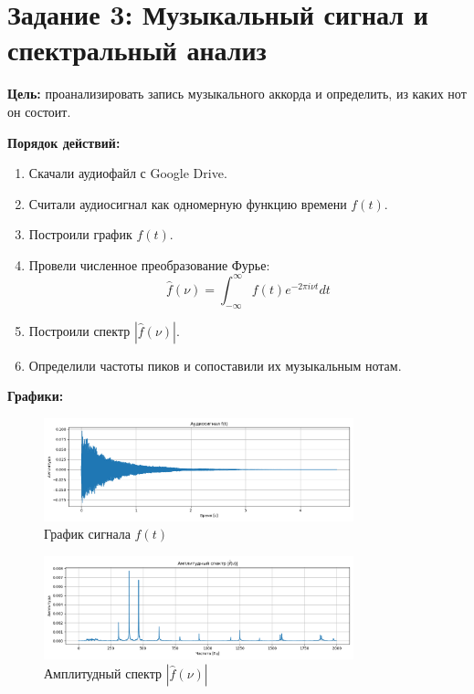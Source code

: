 \section*{Задание 3: Музыкальный сигнал и спектральный анализ}

\textbf{Цель:} проанализировать запись музыкального аккорда и определить, из каких нот он состоит.

\textbf{Порядок действий:}

\begin{enumerate}
    \item Скачали аудиофайл с Google Drive.
    \item Считали аудиосигнал как одномерную функцию времени $f(t)$.
    \item Построили график $f(t)$.
    \item Провели численное преобразование Фурье:
    \[
    \hat{f}(\nu) = \int_{-\infty}^{\infty} f(t) e^{-2\pi i \nu t} dt
    \]
    \item Построили спектр $|\hat{f}(\nu)|$.
    \item Определили частоты пиков и сопоставили их музыкальным нотам.
\end{enumerate}

\textbf{Графики:}

\begin{figure}[H]
    \centering
    \includegraphics[width=0.8\textwidth]{audio_signal.png}
    \caption{График сигнала $f(t)$}
\end{figure}

\begin{figure}[H]
    \centering
    \includegraphics[width=0.8\textwidth]{audio_spectrum.png}
    \caption{Амплитудный спектр $|\hat{f}(\nu)|$}
\end{figure}

